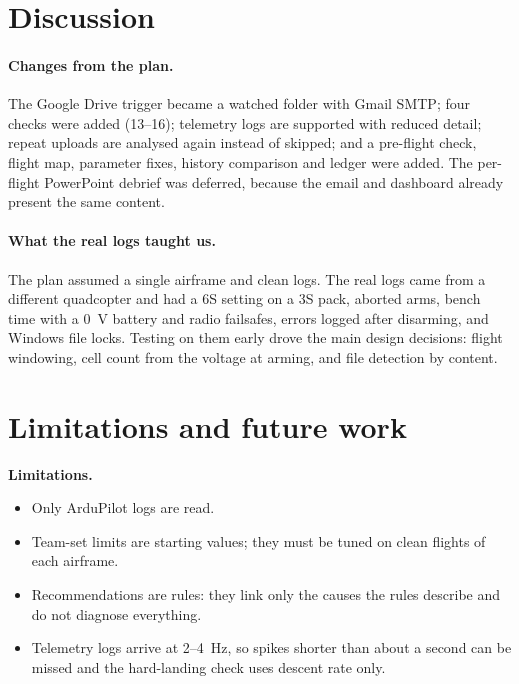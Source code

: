 \documentclass[11pt,a4paper]{article}
\begin{document}
\section{Discussion}

\paragraph{Changes from the plan.}
The Google Drive trigger became a watched folder with Gmail SMTP; four checks were added (13--16); telemetry logs
are supported with reduced detail; repeat uploads are analysed again instead of skipped; and a pre-flight check,
flight map, parameter fixes, history comparison and ledger were added. The per-flight PowerPoint debrief was
deferred, because the email and dashboard already present the same content.

\paragraph{What the real logs taught us.}
The plan assumed a single airframe and clean logs. The real logs came from a different quadcopter and had a 6S
setting on a 3S pack, aborted arms, bench time with a 0~V battery and radio failsafes, errors logged after
disarming, and Windows file locks. Testing on them early drove the main design decisions: flight windowing,
cell count from the voltage at arming, and file detection by content.

\section{Limitations and future work}

\textbf{Limitations.}
\begin{itemize}
  \item Only ArduPilot logs are read.
  \item Team-set limits are starting values; they must be tuned on clean flights of each airframe.
  \item Recommendations are rules: they link only the causes the rules describe and do not diagnose everything.
  \item Telemetry logs arrive at 2--4~Hz, so spikes shorter than about a second can be missed and the hard-landing
        check uses descent rate only.
\end{itemize}
\end{document}
